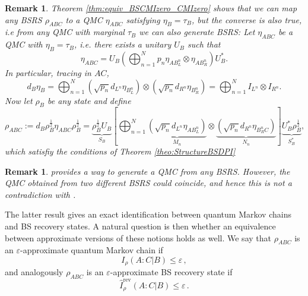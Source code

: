\documentclass[11pt]{article}
\theoremstyle{newdefinition}
\theoremstyle{newplain}
\newtheorem{remark}[definition]{Remark}
\theoremstyle{myplain}
\DeclareMathOperator{\1}{\mathds{1}}
\begin{document}
\begin{remark}
Theorem \ref{thm:equiv_BSCMIzero_CMIzero} shows that we can map any BSRS $\rho_{ABC}$ to a QMC $\eta_{ABC}$ satisfying $\eta_B=\tau_B$, but the converse is also true, i.e from any QMC with marginal $\tau_B$ we can also generate BSRS:  Let $\eta_{ABC}$ be a QMC with $\eta_B=\tau_B$, i.e. there exists a unitary $U_B$ such that
     \begin{equation}
         \eta_{ABC}=U_B \left( \bigoplus_{n=1}^N p_n \eta_{AB_L^n}\otimes\eta_{AB_R^n}   \right)U_B^*.
     \end{equation}
     In particular, tracing in $AC$,
     \begin{equation}
         d_B \eta_B=\bigoplus_{n=1}^N \left(\sqrt{p_n}d_{L^n}\eta_{B_L^n}\right)\otimes \left(\sqrt{p_n}d_{R^n}\eta_{B_R^n}\right)=\bigoplus_{n=1}^N I_{L^n} \otimes I_{R^n}.
     \end{equation}
     Now let $\rho_B$ be any state and define
     \begin{equation}
         \rho_{ABC}:=d_B \rho_B^{\frac{1}{2}}\eta_{ABC}\rho_B^{\frac{1}{2}}=\underbrace{\rho_B^{\frac{1}{2}}U_B}_{S_B}\left[  \bigoplus_{n=1}^N \underbrace{\left(\sqrt{p_n}d_{L^n}\eta_{AB_L^n}\right)}_{M_n}\otimes \underbrace{\left(\sqrt{p_n}d_{R^n}\eta_{B_R^nC}\right)}_{N_n}  \right]\underbrace{U_B^*\rho_B^{\frac{1}{2}}}_{S_B^*},
     \end{equation}
     which satisfiy the conditions of Theorem \ref{theo:StructureBSDPI}
\end{remark}

\begin{remark}
    provides a way to generate a QMC from any BSRS. However, the QMC obtained from two different BSRS could coincide, and hence this is not a contradiction with .
\end{remark}

The latter result gives an exact identification between quantum Markov chains and BS recovery states. A natural question is then whether an equivalence between approximate versions of these notions holds as well. We say that $\rho_{ABC}$ is an $\varepsilon$-approximate quantum Markov chain if
\begin{equation}
    I_\rho(A:C|B) \leq \varepsilon \, ,
\end{equation}
and analogously $\rho_{ABC}$ is an $\varepsilon$-approximate BS recovery state if 
\begin{equation}
    \widehat{I}^{\text{rev}}_\rho(A:C|B) \leq \varepsilon \, . 
\end{equation}
\end{document}
